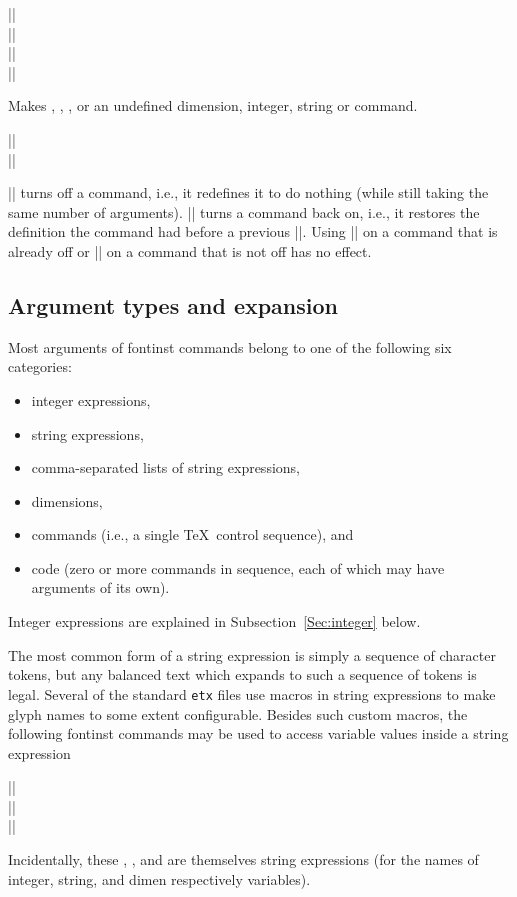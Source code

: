 \documentclass[a4paper]{ltxguide}
\makeatletter
\newenvironment{decl*}[1][]{%
   \par
   \small
   \addvspace{2.3ex}%
   \vskip -\parskip
   \ifx\relax#1\relax
      \def\@decl@date{}%
   \else
      \def\@decl@date{\NEWfeature{#1}}%
   \fi
   \noindent\hspace{-\leftmargini}%
   \begin{tabular}{|l|}%
      \hline\ignorespaces
}{%
      \\\hline
   \end{tabular}%
   \nobreak\@decl@date\par\nobreak
   \vspace{2.3ex}\vskip -\parskip
}
\newcommand*{\marg}{\arg}
\newcommand*{\setfilename}[1]{\texttt{#1}}
\newcommand*{\setpackagename}[1]{\textsf{#1}}
\newcommand{\fontinst}{\setpackagename{font\-inst}\xspace}
\newcommand{\etx}{\setfilename{etx}\xspace}
\makeatother
\begin{document}
\begin{decl}
  |\unsetdim|\\
  |\unsetint|\\
  |\unsetstr|\\
  |\unsetcommand|
\end{decl}
Makes , , , or  an undefined
dimension, integer, string or command.

\begin{decl}[v1.900]
  |\offcommand|\marg{command}\\
  |\oncommand|\marg{command}
\end{decl}
|\offcommand| turns off a command, i.e., it redefines it to do 
nothing (while still taking the same number of arguments). 
|\oncommand| turns a command back on, i.e., it restores the 
definition the command had before a previous |\offcommand|. Using 
|\offcommand| on a command that is already off or |\oncommand| on a 
command that is not off has no effect.


\subsection{Argument types and expansion}

Most arguments of \fontinst commands belong to one of the following 
six categories:
\begin{itemize}
  \item integer expressions,
  \item string expressions,
  \item comma-separated lists of string expressions,
  \item dimensions,
  \item commands (i.e., a single \TeX\ control sequence), and
  \item code (zero or more commands in sequence, each of which may 
    have arguments of its own).
\end{itemize}
Integer expressions are explained in Subsection~\ref{Sec:integer} 
below.

The most common form of a string expression is simply a sequence of 
character tokens, but any balanced text which expands to such a 
sequence of tokens is legal. Several of the standard \etx files use 
macros in string expressions to make glyph names to some extent 
configurable. Besides such custom macros, the following \fontinst 
commands may be used to access variable values inside a string 
expression
\begin{decl*}
  |\strint|\\
  |\str|\\
  |\dim|
\end{decl*}
Incidentally, these , , and  are themselves 
string expressions (for the names of integer, string, and dimen 
respectively variables).
\end{document}
